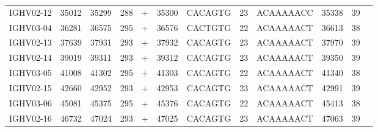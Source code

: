 \begin{tabular}{lrrrlrlllrrl}
  IGHV02-12 & 35012 & 35299 & 288 & + & 35300 & CACAGTG & 23 & ACAAAAACC & 35338 & 39 &  \\ 
  IGHV03-04 & 36281 & 36575 & 295 & + & 36576 & CACTGTG & 22 & ACAAAAACT & 36613 & 38 &  \\ 
  IGHV02-13 & 37639 & 37931 & 293 & + & 37932 & CACAGTG & 23 & ACAAAAACT & 37970 & 39 &  \\ 
  IGHV02-14 & 39019 & 39311 & 293 & + & 39312 & CACAGTG & 23 & ACAAAAACT & 39350 & 39 &  \\ 
  IGHV03-05 & 41008 & 41302 & 295 & + & 41303 & CACAGTG & 22 & ACAAAAACT & 41340 & 38 &  \\ 
  IGHV02-15 & 42660 & 42952 & 293 & + & 42953 & CACAGTG & 23 & ACAAAAACT & 42991 & 39 &  \\ 
  IGHV03-06 & 45081 & 45375 & 295 & + & 45376 & CACAGTG & 22 & ACAAAAACT & 45413 & 38 &  \\ 
  IGHV02-16 & 46732 & 47024 & 293 & + & 47025 & CACAGTG & 23 & ACAAAAACT & 47063 & 39 &  \\ 
   \bottomrule \end{tabular}
